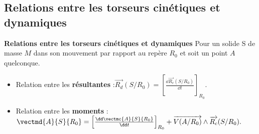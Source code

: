 %
%
%
%
%

\subsection{Relations entre les torseurs cinétiques et dynamiques}
\begin{prop}\textbf{Relations entre les torseurs cinétiques et dynamiques}
Pour un solide S de masse $M$ dans son mouvement par rapport au repère $R_0$ et soit un point $A$ quelconque.
\begin{itemize}
\item Relation entre les \textbf{résultantes} :$
\overrightarrow{R_d}(S/R_0)=\left[\frac{\dd \overrightarrow{R_c}(S/R_0)}{\dd t}\right]_{R_0}.$
\item Relation entre les \textbf{moments} :
$\vectmd{A}{S}{R_0}=\left[\frac{\dd \vectmc{A}{S}{R_0}}{\dd t}\right]_{R_0}+\overrightarrow{V(A/R_0)}\wedge \overrightarrow{R_c}(S/R_0).$
\end{itemize}
\end{prop}




